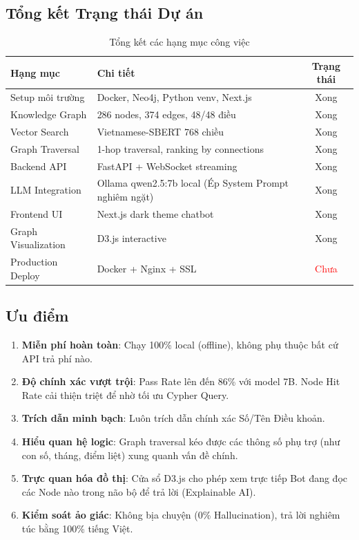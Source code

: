 \documentclass[12pt,a4paper]{article}
\begin{document}
\subsection{Tổng kết Trạng thái Dự án}
\begin{table}[H]
\centering
\caption{Tổng kết các hạng mục công việc}
\begin{tabularx}{\textwidth}{lXc}
\toprule
\textbf{Hạng mục} & \textbf{Chi tiết} & \textbf{Trạng thái} \\
\midrule
Setup môi trường & Docker, Neo4j, Python venv, Next.js & \textcolor{codegreen}{Xong} \\
Knowledge Graph & 286 nodes, 374 edges, 48/48 điều & \textcolor{codegreen}{Xong} \\
Vector Search & Vietnamese-SBERT 768 chiều & \textcolor{codegreen}{Xong} \\
Graph Traversal & 1-hop traversal, ranking by connections & \textcolor{codegreen}{Xong} \\
Backend API & FastAPI + WebSocket streaming & \textcolor{codegreen}{Xong} \\
LLM Integration & Ollama qwen2.5:7b local (Ép System Prompt nghiêm ngặt) & \textcolor{codegreen}{Xong} \\
Frontend UI & Next.js dark theme chatbot & \textcolor{codegreen}{Xong} \\
Graph Visualization & D3.js interactive & \textcolor{codegreen}{Xong} \\
Production Deploy & Docker + Nginx + SSL & \textcolor{red}{Chưa} \\
\bottomrule
\end{tabularx}
\end{table}

\subsection{Ưu điểm}
\begin{enumerate}
\item \textbf{Miễn phí hoàn toàn}: Chạy 100\% local (offline), không phụ thuộc bất cứ API trả phí nào.
\item \textbf{Độ chính xác vượt trội}: Pass Rate lên đến 86\% với model 7B. Node Hit Rate cải thiện triệt để nhờ tối ưu Cypher Query.
\item \textbf{Trích dẫn minh bạch}: Luôn trích dẫn chính xác Số/Tên Điều khoản.
\item \textbf{Hiểu quan hệ logic}: Graph traversal kéo được các thông số phụ trợ (như con số, tháng, điểm liệt) xung quanh vấn đề chính.
\item \textbf{Trực quan hóa đồ thị}: Cửa sổ D3.js cho phép xem trực tiếp Bot đang đọc các Node nào trong não bộ để trả lời (Explainable AI).
\item \textbf{Kiểm soát ảo giác}: Không bịa chuyện (0\% Hallucination), trả lời nghiêm túc bằng 100\% tiếng Việt.
\end{enumerate}
\end{document}
